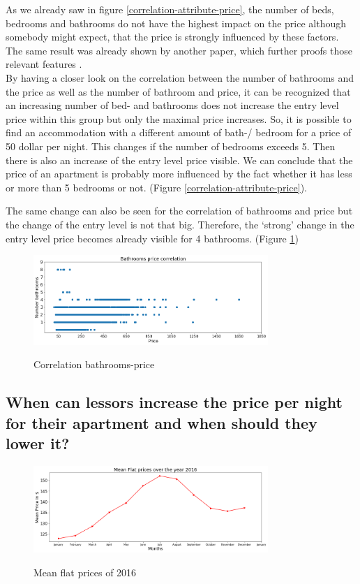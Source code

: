 \documentclass[journal]{IEEEtran}
\begin{document}
As we already saw in figure \ref{correlation-attribute-price}, the number of beds, bedrooms and bathrooms do not have the highest impact on the price although somebody might expect, that the price is strongly influenced by these factors. \\
The same result was already shown by another paper, which further proofs those relevant features \cite{RN1}.\\ By having a closer look on the correlation between the number of bathrooms and the price as well as the number of bathroom and price, it can be recognized that an increasing number of bed- and bathrooms does not increase the entry level price within this group but only the maximal price increases. So, it is possible to find an accommodation with a different amount of bath-/ bedroom for a price of 50 dollar per night. This changes if the number of bedrooms exceeds 5. Then there is also an increase of the entry level price visible. We can conclude that the price of an apartment is probably more influenced by the fact whether it has less or more than 5 bedrooms or not. (Figure \ref{correlation-attribute-price}).

The same change can also be seen for the correlation of bathrooms and price but the change of the entry level is not that big. Therefore, the ‘strong’ change in the entry level price becomes already visible for 4 bathrooms. (Figure \ref{bathrooms-price-correlation})
\begin{figure}
  \begin{center}
  \includegraphics[width=3.5in]{photo/9_bathroom_price_correlation.png}\\
  \caption{Correlation bathrooms-price}\label{bathrooms-price-correlation}
  \end{center}
\end{figure}

\subsection{When can lessors increase the price per night for their apartment and when should they lower it?}

\begin{figure}
  \begin{center}
  \includegraphics[width=3.5in]{photo/12_mean_flat_prices_2016.png}\\
  \caption{Mean flat prices of 2016}\label{mean_flat_prices}
  \end{center}
\end{figure}
\end{document}
